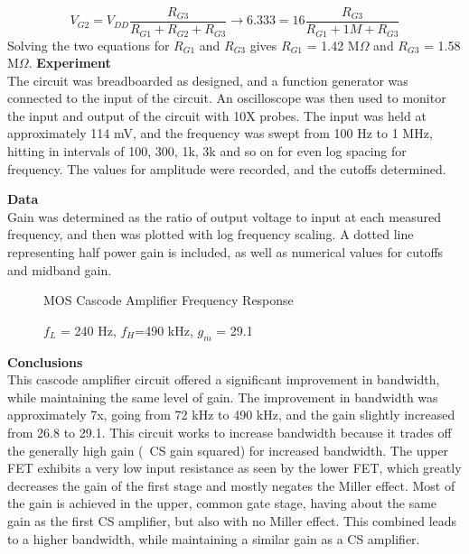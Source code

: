 \documentclass[12pt]{article}
\begin{document}
\begin{equation}
V_{G2} = V_{DD}\frac{R_{G3}}{R_{G1} + R_{G2}+R_{G3}} \rightarrow 6.333 = 16\frac{R_{G3}}{R_{G1} + 1M+R_{G3}}
\end{equation}
Solving the two equations for $R_{G1}$ and $R_{G3}$ gives $R_{G1}$ = 1.42 M$\Omega$ and $R_{G3}$ = 1.58 M$\Omega$.
\textbf{Experiment}\\
The circuit was breadboarded as designed, and a function generator was connected to the input of the circuit. An oscilloscope was then used to monitor the input and output of the circuit with 10X probes. The input was held at approximately 114 mV, and the frequency was swept from 100 Hz to 1 MHz, hitting in intervals of 100, 300, 1k, 3k and so on for even log spacing for frequency. The values for amplitude were recorded, and the cutoffs determined.\\\par
\textbf{Data}\\ Gain was determined as the ratio of output voltage to input at each measured frequency, and then was plotted with log frequency scaling. A dotted line representing half power gain is included, as well as numerical values for cutoffs and midband gain.
\FloatBarrier
\begin{figure}[h!]
\begin{center}
    	\resizebox{0.6\textwidth}{!}{}
\end{center}
\caption{MOS Cascode Amplifier Frequency Response}
\caption*{$f_L$ = 240 Hz, $f_H$=490 kHz, $g_m$ = 29.1}
\end{figure}
\FloatBarrier
\textbf{Conclusions}\\
This cascode amplifier circuit offered a significant improvement in bandwidth, while maintaining the same level of gain. The improvement in bandwidth was approximately 7x, going from 72 kHz to 490 kHz, and the gain slightly increased from 26.8 to 29.1. This circuit works to increase bandwidth because it trades off the generally high gain (~CS gain squared) for increased bandwidth. The upper FET exhibits a very low input resistance as seen by the lower FET, which greatly decreases the gain of the first stage and mostly negates the Miller effect. Most of the gain is achieved in the upper, common gate stage, having about the same gain as the first CS amplifier, but also with no Miller effect. This combined leads to a higher bandwidth, while maintaining a similar gain as a CS amplifier.
\end{document}
